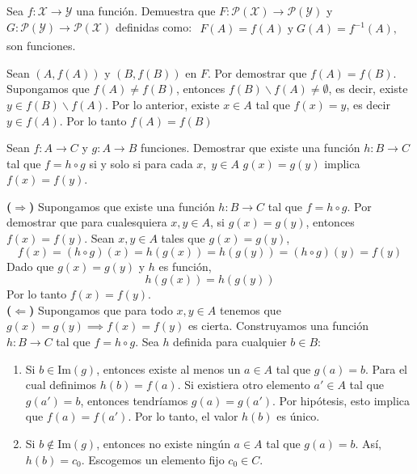 \documentclass[fc]{tarea}
\newcommand{\menos}{\backslash}
\begin{document}
\begin{exercise}
 Sea $f: \mathcal{X} \to \mathcal{Y}$ una función. Demuestra que $F: \mathcal{P}(\mathcal{X}) \to \mathcal{P}(\mathcal{Y})$
 y $G: \mathcal{P}(\mathcal{Y}) \to \mathcal{P}(\mathcal{X})$ definidas como: $\begin{aligned}
    F(A) = f(A)\; \text{y}\; G(A) = f^{-1}(A),
 \end{aligned}$
son funciones.
\end{exercise}

\begin{solution}
Sean $(A, f(A))$ y $(B, f(B))$ en $F$. Por demostrar que $f(A)=f(B)$. Supongamos que $f(A) \neq f(B)$, entonces
$f(B) \menos f(A) \neq \emptyset$, es decir, existe $y \in f(B) \menos f(A)$. Por lo anterior, existe $x \in A$ tal que
$f(x) = y$, es decir $y \in f(A)$. Por lo tanto $f(A) = f(B)$
\end{solution}

\begin{exercise}
Sean $f: A \to C$ y $g:A \to B$ funciones. Demostrar que existe una función $h: B \to C$ tal que $f=h \circ g$
si y solo si para cada $x,\; y \in A$ $g(x) = g(y)$ implica $f(x) = f(y)$.
\end{exercise}

\begin{solution}
\textbf{($\Rightarrow$)} Supongamos que existe una función $h: B \to C$ tal que $f = h \circ g$.
Por demostrar que para cualesquiera $x, y \in A$, si $g(x) = g(y)$, entonces $f(x) = f(y)$.
Sean $x, y \in A$ tales que $g(x) = g(y)$,
$$f(x) = (h \circ g)(x) = h(g(x)) = h(g(y)) = (h \circ g)(y) = f(y)$$
Dado que $g(x) = g(y)$ y $h$ es función,
$$h(g(x)) = h(g(y))$$
Por lo tanto $f(x) = f(y)$.
\\
\textbf{($\Leftarrow$)} Supongamos que para todo $x, y \in A$ tenemos que $g(x) = g(y) \implies f(x) = f(y)$ es cierta.
Construyamos una función $h: B \to C$ tal que $f = h \circ g$. Sea $h$ definida para cualquier $b \in B$:
\begin{enumerate}
    \item Si $b \in \text{Im}(g)$, entonces existe al menos un $a \in A$ tal que $g(a) = b$. Para el cual definimos $h(b) = f(a)$.
      Si existiera otro elemento $a' \in A$ tal que $g(a') = b$, entonces tendríamos $g(a) = g(a')$. Por hipótesis, esto implica
      que $f(a) = f(a')$. Por lo tanto, el valor $h(b)$ es único.
    
    \item Si $b \notin \text{Im}(g)$, entonces no existe ningún $a \in A$ tal que $g(a)=b$. Así, $h(b) = c_0$. 
    Escogemos un elemento fijo $c_0 \in C$.
\end{enumerate}

\end{solution}
\end{document}
